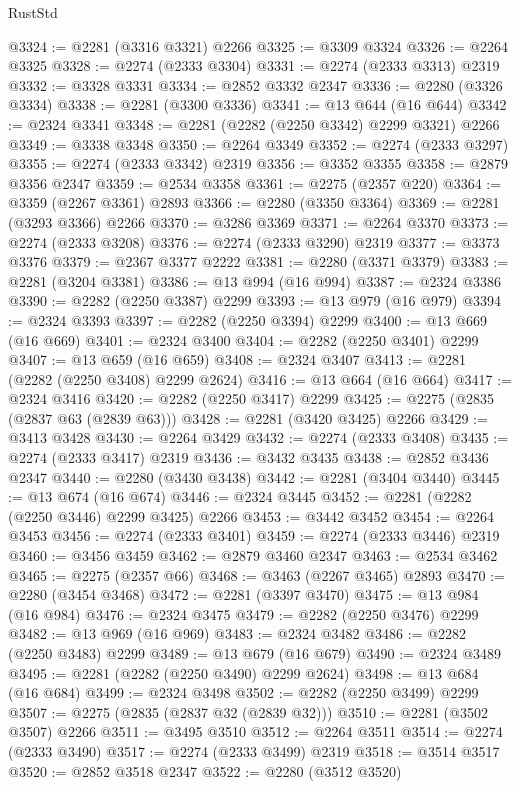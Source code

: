 \begin{lexlean}{RustStd}
\begin{coremodule}
@3324 := @2281 (@3316 @3321) @2266
@3325 := @3309 @3324
@3326 := @2264 @3325
@3328 := @2274 (@2333 @3304)
@3331 := @2274 (@2333 @3313) @2319
@3332 := @3328 @3331
@3334 := @2852 @3332 @2347
@3336 := @2280 (@3326 @3334)
@3338 := @2281 (@3300 @3336)
@3341 := @13 @644 (@16 @644)
@3342 := @2324 @3341
@3348 := @2281 (@2282 (@2250 @3342) @2299 @3321) @2266
@3349 := @3338 @3348
@3350 := @2264 @3349
@3352 := @2274 (@2333 @3297)
@3355 := @2274 (@2333 @3342) @2319
@3356 := @3352 @3355
@3358 := @2879 @3356 @2347
@3359 := @2534 @3358
@3361 := @2275 (@2357 @220)
@3364 := @3359 (@2267 @3361) @2893
@3366 := @2280 (@3350 @3364)
@3369 := @2281 (@3293 @3366) @2266
@3370 := @3286 @3369
@3371 := @2264 @3370
@3373 := @2274 (@2333 @3208)
@3376 := @2274 (@2333 @3290) @2319
@3377 := @3373 @3376
@3379 := @2367 @3377 @2222
@3381 := @2280 (@3371 @3379)
@3383 := @2281 (@3204 @3381)
@3386 := @13 @994 (@16 @994)
@3387 := @2324 @3386
@3390 := @2282 (@2250 @3387) @2299
@3393 := @13 @979 (@16 @979)
@3394 := @2324 @3393
@3397 := @2282 (@2250 @3394) @2299
@3400 := @13 @669 (@16 @669)
@3401 := @2324 @3400
@3404 := @2282 (@2250 @3401) @2299
@3407 := @13 @659 (@16 @659)
@3408 := @2324 @3407
@3413 := @2281 (@2282 (@2250 @3408) @2299 @2624)
@3416 := @13 @664 (@16 @664)
@3417 := @2324 @3416
@3420 := @2282 (@2250 @3417) @2299
@3425 := @2275 (@2835 (@2837 @63 (@2839 @63)))
@3428 := @2281 (@3420 @3425) @2266
@3429 := @3413 @3428
@3430 := @2264 @3429
@3432 := @2274 (@2333 @3408)
@3435 := @2274 (@2333 @3417) @2319
@3436 := @3432 @3435
@3438 := @2852 @3436 @2347
@3440 := @2280 (@3430 @3438)
@3442 := @2281 (@3404 @3440)
@3445 := @13 @674 (@16 @674)
@3446 := @2324 @3445
@3452 := @2281 (@2282 (@2250 @3446) @2299 @3425) @2266
@3453 := @3442 @3452
@3454 := @2264 @3453
@3456 := @2274 (@2333 @3401)
@3459 := @2274 (@2333 @3446) @2319
@3460 := @3456 @3459
@3462 := @2879 @3460 @2347
@3463 := @2534 @3462
@3465 := @2275 (@2357 @66)
@3468 := @3463 (@2267 @3465) @2893
@3470 := @2280 (@3454 @3468)
@3472 := @2281 (@3397 @3470)
@3475 := @13 @984 (@16 @984)
@3476 := @2324 @3475
@3479 := @2282 (@2250 @3476) @2299
@3482 := @13 @969 (@16 @969)
@3483 := @2324 @3482
@3486 := @2282 (@2250 @3483) @2299
@3489 := @13 @679 (@16 @679)
@3490 := @2324 @3489
@3495 := @2281 (@2282 (@2250 @3490) @2299 @2624)
@3498 := @13 @684 (@16 @684)
@3499 := @2324 @3498
@3502 := @2282 (@2250 @3499) @2299
@3507 := @2275 (@2835 (@2837 @32 (@2839 @32)))
@3510 := @2281 (@3502 @3507) @2266
@3511 := @3495 @3510
@3512 := @2264 @3511
@3514 := @2274 (@2333 @3490)
@3517 := @2274 (@2333 @3499) @2319
@3518 := @3514 @3517
@3520 := @2852 @3518 @2347
@3522 := @2280 (@3512 @3520)

\end{coremodule}
\end{lexlean}
